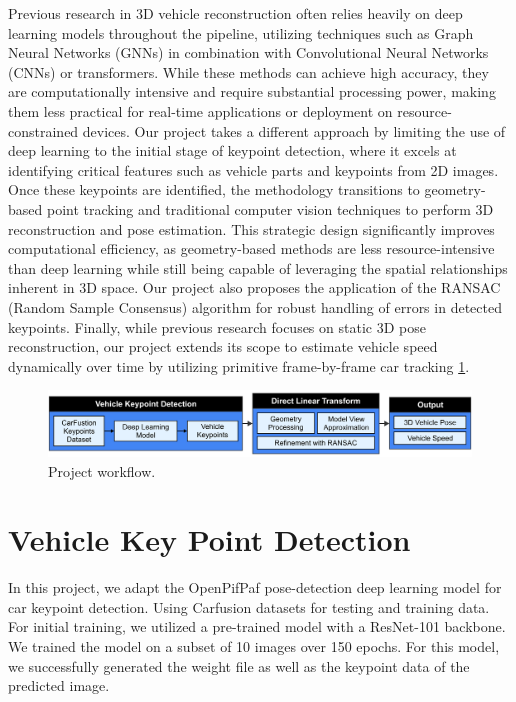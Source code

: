 \documentclass[conference]{IEEEtran}
\begin{document}
Previous research in 3D vehicle reconstruction often relies heavily on deep learning models throughout the pipeline, utilizing techniques such as Graph Neural Networks (GNNs) in combination with Convolutional Neural Networks (CNNs) or transformers. While these methods can achieve high accuracy, they are computationally intensive and require substantial processing power, making them less practical for real-time applications or deployment on resource-constrained devices. Our project takes a different approach by limiting the use of deep learning to the initial stage of keypoint detection, where it excels at identifying critical features such as vehicle parts and keypoints from 2D images. Once these keypoints are identified, the methodology transitions to geometry-based point tracking and traditional computer vision techniques to perform 3D reconstruction and pose estimation. This strategic design significantly improves computational efficiency, as geometry-based methods are less resource-intensive than deep learning while still being capable of leveraging the spatial relationships inherent in 3D space. Our project also proposes the application of the RANSAC (Random Sample Consensus) algorithm for robust handling of errors in detected keypoints. Finally, while previous research focuses on static 3D pose reconstruction, our project extends its scope to estimate vehicle speed dynamically over time by utilizing primitive frame-by-frame car tracking
\ref{img:workflow}.

\begin{figure}
    \centering
    \includegraphics[width=0.9\columnwidth]{./images/workflow.png}
    \caption{Project workflow.}
    \label{img:workflow}
\end{figure}

\section{Vehicle Key Point Detection}

In this project, we adapt the OpenPifPaf pose-detection deep learning model for car keypoint detection. Using Carfusion datasets for testing and training data. For initial training, we utilized a pre-trained model with a ResNet-101 backbone. We trained the model on a subset of 10 images over 150 epochs. For this model, we successfully generated the weight file as well as the keypoint data of the predicted image.
\end{document}

